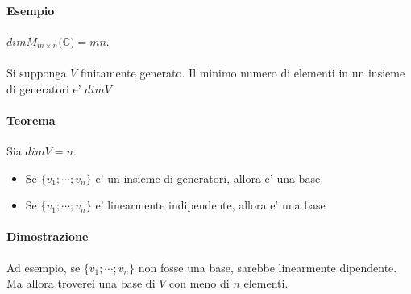 \documentclass[a4paper, 10pt]{article}
\begin{document}
	\paragraph*{Esempio} $dimM_{m \times n}(\mathbb{C)} = mn$. 
	\noindent \\ \\
	Si supponga $V$ finitamente generato. Il minimo numero di elementi in un insieme di generatori e' $dimV$ 
	\paragraph*{Teorema} Sia $dimV = n$. 
		\begin{itemize}
			\item Se $\lbrace v_1; \cdots ; v_n \rbrace $ e' un insieme di generatori, allora e' una base
			\item Se $\lbrace v_1; \cdots ; v_n \rbrace $ e' linearmente indipendente, allora e' una base
		\end{itemize}
	\paragraph*{Dimostrazione}
	Ad esempio, se $\lbrace v_1; \cdots ; v_n \rbrace $ non fosse una base, sarebbe linearmente dipendente. 
	Ma allora troverei una base di $V$ con meno di $n$ elementi.
	
\end{document}
